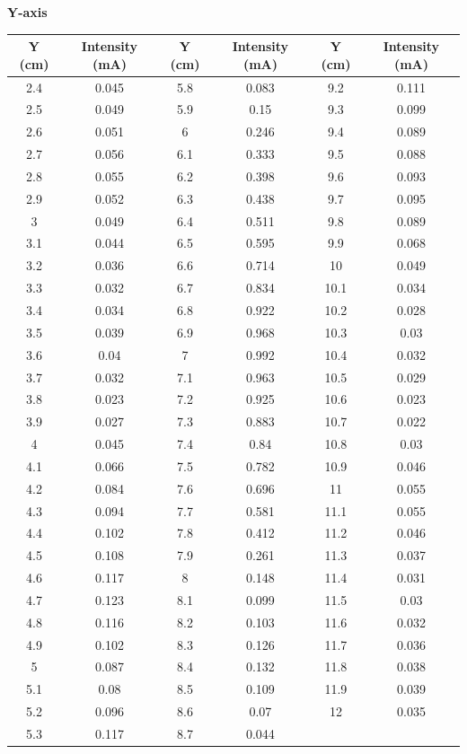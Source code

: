 \documentclass[12pt]{report}
\begin{document}
\newpage
\textbf{Y-axis}
\begin{center}
	\begin{tabular}{ |c|c|c|c|c|c| } 
		\hline
		Y (cm) & Intensity (mA) & Y (cm) & Intensity (mA) & Y (cm) & Intensity (mA)\\ 
		\hline
		2.4 & 0.045 & 5.8 & 0.083 & 9.2  & 0.111 \\
		2.5 & 0.049 & 5.9 & 0.15  & 9.3  & 0.099 \\
		2.6 & 0.051 & 6   & 0.246 & 9.4  & 0.089 \\
		2.7 & 0.056 & 6.1 & 0.333 & 9.5  & 0.088 \\
		2.8 & 0.055 & 6.2 & 0.398 & 9.6  & 0.093 \\
		2.9 & 0.052 & 6.3 & 0.438 & 9.7  & 0.095 \\
		3   & 0.049 & 6.4 & 0.511 & 9.8  & 0.089 \\
		3.1 & 0.044 & 6.5 & 0.595 & 9.9  & 0.068 \\
		3.2 & 0.036 & 6.6 & 0.714 & 10   & 0.049 \\
		3.3 & 0.032 & 6.7 & 0.834 & 10.1 & 0.034 \\
		3.4 & 0.034 & 6.8 & 0.922 & 10.2 & 0.028 \\
		3.5 & 0.039 & 6.9 & 0.968 & 10.3 & 0.03  \\
		3.6 & 0.04  & 7   & 0.992 & 10.4 & 0.032 \\
		3.7 & 0.032 & 7.1 & 0.963 & 10.5 & 0.029 \\
		3.8 & 0.023 & 7.2 & 0.925 & 10.6 & 0.023 \\
		3.9 & 0.027 & 7.3 & 0.883 & 10.7 & 0.022 \\
		4   & 0.045 & 7.4 & 0.84  & 10.8 & 0.03  \\
		4.1 & 0.066 & 7.5 & 0.782 & 10.9 & 0.046 \\
		4.2 & 0.084 & 7.6 & 0.696 & 11   & 0.055 \\
		4.3 & 0.094 & 7.7 & 0.581 & 11.1 & 0.055 \\
		4.4 & 0.102 & 7.8 & 0.412 & 11.2 & 0.046 \\
		4.5 & 0.108 & 7.9 & 0.261 & 11.3 & 0.037 \\
		4.6 & 0.117 & 8   & 0.148 & 11.4 & 0.031 \\
		4.7 & 0.123 & 8.1 & 0.099 & 11.5 & 0.03  \\
		4.8 & 0.116 & 8.2 & 0.103 & 11.6 & 0.032 \\
		4.9 & 0.102 & 8.3 & 0.126 & 11.7 & 0.036 \\
		5   & 0.087 & 8.4 & 0.132 & 11.8 & 0.038 \\
		5.1 & 0.08  & 8.5 & 0.109 & 11.9 & 0.039 \\
		5.2 & 0.096 & 8.6 & 0.07  & 12   & 0.035 \\
		5.3 & 0.117 & 8.7 & 0.044 &      &       \\
		\hline
	\end{tabular}
\\
\end{center}
\end{document}
